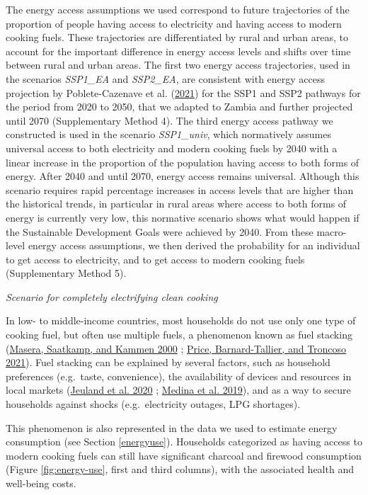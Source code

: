 \documentclass[
]{article}
\begin{document}
The energy access assumptions we used correspond to future trajectories of the proportion of people having access to electricity and having access to modern cooking fuels. These trajectories are differentiated by rural and urban areas, to account for the important difference in energy access levels and shifts over time between rural and urban areas. The first two energy access trajectories, used in the scenarios \emph{SSP1\_EA} and \emph{SSP2\_EA}, are consistent with energy access projection by Poblete-Cazenave et al. (\protect\hyperlink{ref-poblete-cazenave_global_2021}{2021}) for the SSP1 and SSP2 pathways for the period from 2020 to 2050, that we adapted to Zambia and further projected until 2070 (Supplementary Method 4). The third energy access pathway we constructed is used in the scenario \emph{SSP1\_univ}, which normatively assumes universal access to both electricity and modern cooking fuels by 2040 with a linear increase in the proportion of the population having access to both forms of energy. After 2040 and until 2070, energy access remains universal. Although this scenario requires rapid percentage increases in access levels that are higher than the historical trends, in particular in rural areas where access to both forms of energy is currently very low, this normative scenario shows what would happen if the Sustainable Development Goals were achieved by 2040. From these macro-level energy access assumptions, we then derived the probability for an individual to get access to electricity, and to get access to modern cooking fuels (Supplementary Method 5).

\emph{Scenario for completely electrifying clean cooking}

In low- to middle-income countries, most households do not use only one type of cooking fuel, but often use multiple fuels, a phenomenon known as fuel stacking (\protect\hyperlink{ref-masera_linear_2000}{Masera, Saatkamp, and Kammen 2000} ; \protect\hyperlink{ref-price_stacked_2021}{Price, Barnard-Tallier, and Troncoso 2021}).
Fuel stacking can be explained by several factors, such as household preferences (e.g.~taste, convenience), the availability of devices and resources in local markets (\protect\hyperlink{ref-jeuland_preferences_2020}{Jeuland et al. 2020} ; \protect\hyperlink{ref-medina_understanding_2019}{Medina et al. 2019}), and as a way to secure households against shocks (e.g.~electricity outages, LPG shortages).

This phenomenon is also represented in the data we used to estimate energy consumption (see Section \ref{energyuse}). Households categorized as having access to modern cooking fuels can still have significant charcoal and firewood consumption (Figure \ref{fig:energy-use}, first and third columns), with the associated health and well-being costs.
\end{document}
